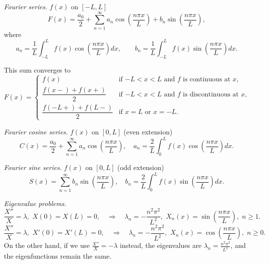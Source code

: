 \documentclass[11pt]{article}
\begin{document}
\begin{preamble}
\begin{formulaitem}
\item \textsl{Fourier series.} $f(x)$ on $[-L, L]$
\[F(x) = \frac{a_{0}}{2}+\sum_{n=1}^{\infty}a_{n}\cos\left(\frac{n\pi x}{L}\right) + b_{n}\sin \left(\frac{n\pi x}{L}\right),\]
where
\[a_{n} = \frac{1}{L}\int_{-L}^{L}f(x)\cos \left(\frac{n\pi x}{L}\right) dx, \qquad b_{n}  = \frac{1}{L}\int_{-L}^{L}f(x)\sin \left(\frac{n\pi x}{L}\right) dx.\]

This sum converges to
\begin{equation*}
F(x) = \begin{cases} f(x) & \text{if $-L<x<L$ and $f$ is continuous at $x$,} \\[0.5em]
                                 \dfrac{f(x-)+f(x+)}{2} & \text{if $-L<x<L$ and $f$ is discontinuous at $x$,} \\[0.5em]
                                 \dfrac{f(-L+)+f(L-)}{2} & \text{if $x=L$ or $x=-L$.} \end{cases} 
\end{equation*}

\item \textsl{Fourier cosine series.} $f(x)$ on $[0, L]$ (even extension)
\[C(x) = \frac{a_{0}}{2}+\sum_{n=1}^{\infty}a_{n}\cos\left(\frac{n\pi x}{L}\right), \quad a_{n} = \frac{2}{L}\int_{0}^{L}f(x)\cos \left(\frac{n\pi x}{L}\right) dx.\]

\item \textsl{Fourier sine series.} $f(x)$ on $[0, L]$ (odd extension)
\[S(x) = \sum_{n=1}^{\infty}b_{n}\sin\left(\frac{n\pi x}{L}\right), \quad b_{n} = \frac{2}{L}\int_{0}^{L}f(x)\sin \left(\frac{n\pi x}{L}\right) dx.\]

\item \textsl{Eigenvalue problems.} 
\[\frac{X''}{X}=\lambda, \,\, X(0)=X(L)=0, \quad \Rightarrow \quad \boxed{\lambda_{n}=-\frac{n^{2}\pi^{2}}{L^{2}}, \,\, X_{n}(x)=\sin \left( \frac{n\pi x}{L} \right)}, \,\, n\geq1.\]
\[\frac{X''}{X}=\lambda, \,\, X'(0)=X'(L)=0, \quad \Rightarrow \quad \boxed{\lambda_{n}=-\frac{n^{2}\pi^{2}}{L^{2}}, \,\, X_{n}(x)=\cos \left( \frac{n\pi x}{L} \right)},\,\, n\geq0.\]
On the other hand, if we use $\frac{X''}{X}=-\lambda$ instead, the eigenvalues are $\lambda_{n}=\frac{n^{2}\pi^{2}}{L^{2}}$, and the eigenfunctions remain the same.


\end{formulaitem}
\end{preamble}
\end{document}

